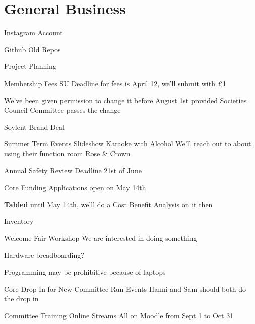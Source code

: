 \documentclass[11pt,hacksoc]{meetingmins}
\begin{document}
\section{General Business}
\begin{items}
	\item
	Instagram Account
		\subitem
		\tabled
	
	\item
	Github
		\subitem 
		Old Repos
		
		\subitem
		Project Planning
	
	\item
	Membership Fees
		\subitem
		SU Deadline for fees is April 12, we'll submit with \pounds1
		
		\subitem
		We've been given permission to change it before August 1st provided Societies Council Committee passes the change
	
	\item
	Soylent Brand Deal
		\subitem
		\tabled
	
	\item
	Summer Term Events
		\subitem
		Slideshow Karaoke with Alcohol
			\subsubitem
			 We'll reach out to about using their function room Rose \& Crown
			 
			 \subsubitem
		
	
	\item
	Annual Safety Review
		\subitem
		Deadline 21st of June
		
	\item
	Core Funding
		\subitem
		Applications open on May 14th
		
		\subitem
		\textbf{Tabled} until May 14th, we'll do a Cost Benefit Analysis on it then
	
	\item
	Inventory
		\subitem
		
	\item
	Welcome Fair 
		\subitem
		Workshop
			\subsubitem
			We are interested in doing something
			
			\subsubitem
			Hardware breadboarding?
			
			\subsubitem
			Programming may be prohibitive because of laptops
		
	\item
	Core Drop In for New Committee Run Events
		\subitem
		Hanni and Sam should both do the drop in
	
	\item
	Committee Training
		\subitem
		Online Streams
			\subsubitem
			All on Moodle from Sept 1 to Oct 31
		

\end{items}
\end{document}
